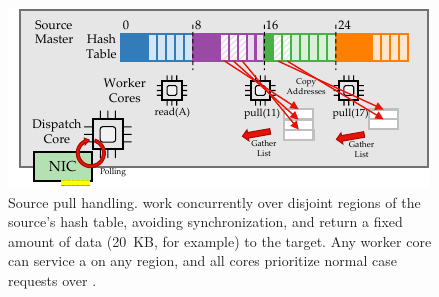 \begin{figure}[t]
\centering
\includegraphics[width=0.9\columnwidth]{figures/rocksteady-source.pdf}
\caption{Source pull handling. \pulls work concurrently over disjoint
  regions of the source's hash table, avoiding synchronization, and
  return a fixed amount of data (20~KB, for example) to the target. Any
  worker core can service a \pull on any region, and all cores
  prioritize normal case requests over \pulls.}%
\label{fig:source}%
\end{figure}
